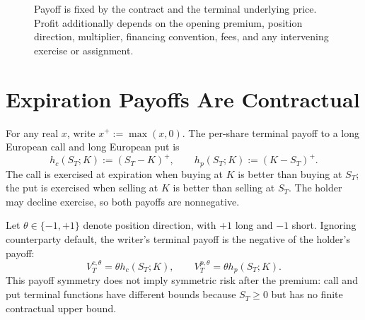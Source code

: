 \documentclass[11pt]{article}
\begin{document}
\begin{figure}[ht]
  \centering
  \caption{Payoff is fixed by the contract and the terminal underlying price. Profit additionally depends on the opening premium, position direction, multiplier, financing convention, fees, and any intervening exercise or assignment.}
  \label{fig:contract-to-profit}
\end{figure}

\section{Expiration Payoffs Are Contractual}

For any real $x$, write $x^+:=\max(x,0)$. The per-share terminal payoff to a long European call and long European put is
\begin{equation}
  \label{eq:long-payoffs}
  h_c(S_T;K):=(S_T-K)^+,
  \qquad
  h_p(S_T;K):=(K-S_T)^+.
\end{equation}
The call is exercised at expiration when buying at $K$ is better than buying at $S_T$; the put is exercised when selling at $K$ is better than selling at $S_T$. The holder may decline exercise, so both payoffs are nonnegative.

Let $\theta\in\{-1,+1\}$ denote position direction, with $+1$ long and $-1$ short. Ignoring counterparty default, the writer's terminal payoff is the negative of the holder's payoff:
\begin{equation}
  \label{eq:signed-payoff}
  V_T^{c,\theta}=\theta h_c(S_T;K),
  \qquad
  V_T^{p,\theta}=\theta h_p(S_T;K).
\end{equation}
This payoff symmetry does not imply symmetric risk after the premium: call and put terminal functions have different bounds because $S_T\geq0$ but has no finite contractual upper bound.
\end{document}
